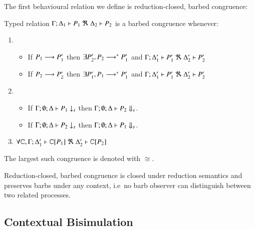 The first behavioural relation we define is reduction-closed, barbed congruence:
%
\begin{definition}\rm
	Typed relation
	$\horel{\Gamma}{\Delta_1}{P_1}{\ \Re\ }{\Delta_2}{P_2}$
	is a barbed congruence whenever:
%
	\begin{enumerate}
		\item
		\begin{itemize}
			\item	If $P_1 \longrightarrow P_1'$ then $\exists P_2', P_2 \longrightarrow^* P_1'$ and
				$\horel{\Gamma}{\Delta_1'}{P_1'}{\ \Re\ }{\Delta_2'}{P_2'}$
			\item	If $P_2 \longrightarrow P_2'$ then $\exists P_1', P_1 \longrightarrow^* P_1'$ and
				$\horel{\Gamma}{\Delta_1'}{P_1'}{\ \Re\ }{\Delta_2'}{P_2'}$
		\end{itemize}

		\item
		\begin{itemize}
			\item	If $\Gamma;\emptyset;\Delta \vdash P_1 \downarrow_{s}$ then $\Gamma;\emptyset;\Delta \vdash P_2 \Downarrow_{s}$.
			\item	If $\Gamma;\emptyset;\Delta \vdash P_2 \downarrow_{s}$ then $\Gamma;\emptyset;\Delta \vdash P_1 \Downarrow_{s}$.
		\end{itemize}

		\item	$\forall \C, \horel{\Gamma}{\Delta_1'}{\context{\C}{P_1}}{\ \Re\ }{\Delta_2'}{\context{\C}{P_2}}$
	\end{enumerate}
%
	The largest such congruence is denoted with $\cong$.
\end{definition}
%
\noi Reduction-closed, barbed congruence is closed under reduction semantics and 
preserves barbs under any context, i.e~no barb observer can distinguish
between two related processes.

\subsection{Contextual Bisimulation}

